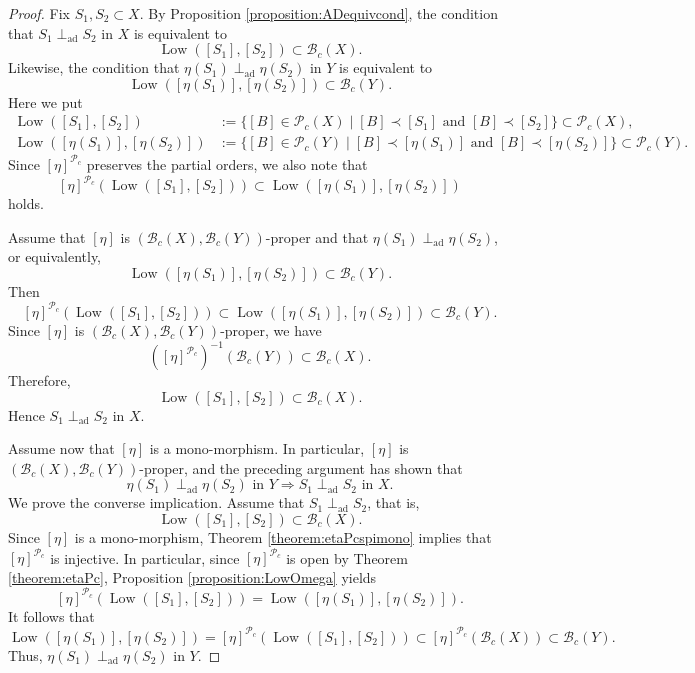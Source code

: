 \documentclass[12pt, a4paper]{amsart}
\theoremstyle{definition}
\newcommand{\Low}{\mathop{\mathrm{Low}}\nolimits}
\newcommand{\adperp}{\mathrel{\perp_{\mathrm{ad}}}}
\begin{document}
\begin{proof}
Fix $S_1,S_2 \subset X$. By Proposition \ref{proposition:ADequivcond}, the condition that $S_1 \adperp S_2$ in $X$ is equivalent to
\[
\Low([S_1],[S_2]) \subset \mathcal{B}_c(X).
\]
Likewise, the condition that $\eta(S_1) \adperp \eta(S_2)$ in $Y$ is equivalent to
\[
\Low([\eta(S_1)],[\eta(S_2)]) \subset \mathcal{B}_c(Y).
\]
Here we put
\begin{align*}
\Low([S_1],[S_2]) &:= \{ [B] \in \mathcal{P}_c(X) \mid [B] \prec [S_1] \text{ and } [B] \prec [S_2] \} \subset \mathcal{P}_c(X), \\
\Low([\eta(S_1)],[\eta(S_2)]) &:= \{ [B] \in \mathcal{P}_c(Y) \mid [B] \prec [\eta(S_1)] \text{ and } [B] \prec [\eta(S_2)] \} \subset \mathcal{P}_c(Y).
\end{align*}
Since $[\eta]^{\mathcal{P}_c}$ preserves the partial orders, we also note that
\[
[\eta]^{\mathcal{P}_c}(\Low([S_1],[S_2])) \subset \Low([\eta(S_1)],[\eta(S_2)])
\]
holds.

Assume that $[\eta]$ is $(\mathcal{B}_c(X),\mathcal{B}_c(Y))$-proper and that $\eta(S_1) \adperp \eta(S_2)$, or equivalently,
\[
\Low([\eta(S_1)],[\eta(S_2)]) \subset \mathcal{B}_c(Y).
\]
Then
\[
[\eta]^{\mathcal{P}_c}(\Low([S_1],[S_2])) \subset \Low([\eta(S_1)],[\eta(S_2)]) \subset \mathcal{B}_c(Y).
\]
Since $[\eta]$ is $(\mathcal{B}_c(X),\mathcal{B}_c(Y))$-proper, we have
\[
([\eta]^{\mathcal{P}_c})^{-1}(\mathcal{B}_c(Y)) \subset \mathcal{B}_c(X).
\]
Therefore,
\[
\Low([S_1],[S_2]) \subset \mathcal{B}_c(X).
\]
Hence $S_1 \adperp S_2$ in $X$.

Assume now that $[\eta]$ is a mono-morphism. In particular, $[\eta]$ is $(\mathcal{B}_c(X),\mathcal{B}_c(Y))$-proper, and the preceding argument has shown that
\[
\eta(S_1) \adperp \eta(S_2) \text{ in } Y \Rightarrow S_1 \adperp S_2 \text{ in } X.
\]
We prove the converse implication. Assume that $S_1 \adperp S_2$, that is,
\[
\Low([S_1],[S_2]) \subset \mathcal{B}_c(X).
\]
Since $[\eta]$ is a mono-morphism, Theorem \ref{theorem:etaPcspimono} implies that $[\eta]^{\mathcal{P}_c}$ is injective. In particular, 
since $[\eta]^{\mathcal{P}_c}$ is open by Theorem \ref{theorem:etaPc}, 
Proposition \ref{proposition:LowOmega} yields
\[
[\eta]^{\mathcal{P}_c}(\Low([S_1],[S_2])) = \Low([\eta(S_1)],[\eta(S_2)]).
\]
It follows that
\[
\Low([\eta(S_1)],[\eta(S_2)]) = [\eta]^{\mathcal{P}_c}(\Low([S_1],[S_2])) \subset [\eta]^{\mathcal{P}_c}(\mathcal{B}_c(X)) \subset \mathcal{B}_c(Y).
\]
Thus, $\eta(S_1) \adperp \eta(S_2)$ in $Y$.
\end{proof}
\end{document}
